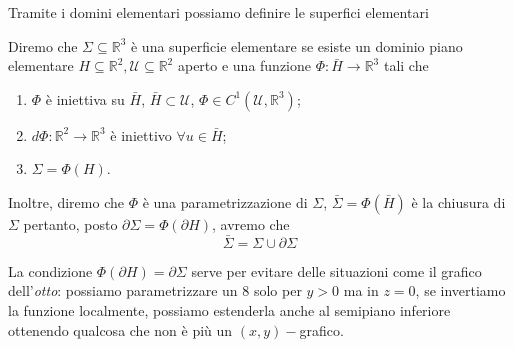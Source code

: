 %
Tramite i domini elementari possiamo definire le superfici elementari
%
\vspace{0.5cm}
\begin{definition}[\textcolor{blue}{superficie elmentare}]
	Diremo che $\Sigma \subseteq \mathbb{R}^3$ è una superficie elementare se esiste un dominio piano elementare $H \subseteq \mathbb{R}^2, \mathcal{U} \subseteq \mathbb{R}^2$ aperto e una funzione $\Phi: \bar{H} \to \mathbb{R}^3$ tali che
	\begin{enumerate}[label=\protect\circled{\arabic*}]
		\item $\Phi$ è iniettiva su $\bar{H}$, $\bar{H} \subset \mathcal{U}$, $\Phi \in C^1(\mathcal{U}, \mathbb{R}^3)$;
		\item $d\Phi: \mathbb{R}^2 \to \mathbb{R}^3$ è iniettivo $\forall u \in \bar{H}$;
		\item $\Sigma = \Phi(H)$.
	\end{enumerate}
	Inoltre, diremo che $\Phi$ è una parametrizzazione di $\Sigma$, $\bar{\Sigma} = \Phi(\bar{H})$ è la chiusura di $\Sigma$ pertanto, posto $\partial \Sigma = \Phi(\partial H)$, avremo che
	\begin{equation}
		\bar{\Sigma} = \Sigma \cup \partial \Sigma
	\end{equation}
\end{definition}
%
\begin{remark}
	La condizione $\Phi(\partial H) = \partial \Sigma$ serve per evitare delle situazioni come il grafico dell'\emph{otto}: possiamo parametrizzare un $8$ solo per $y>0$ ma in $z=0$, se invertiamo la funzione localmente, possiamo estenderla anche al semipiano inferiore ottenendo qualcosa che non è più un $(x, y)-$grafico.
\end{remark}
%
